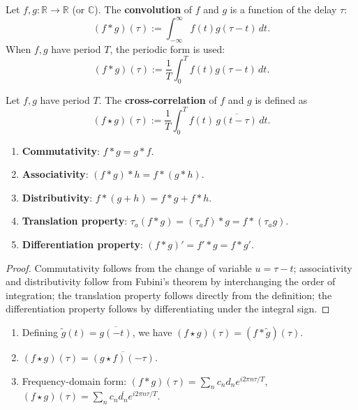 \begin{definition}\label{def:convolution}
Let $f, g: \mathbb{R} \to \mathbb{R}$ (or $\mathbb{C}$). The \textbf{convolution} of $f$ and $g$ is a function of the delay $\tau$:
\[
(f * g)(\tau) := \int_{-\infty}^{\infty} f(t) g(\tau - t)\,dt.
\]
When $f, g$ have period $T$, the periodic form is used:
\[
(f * g)(\tau) := \frac{1}{T}\int_0^T f(t) g(\tau - t)\,dt.
\]
\end{definition}

\begin{definition}\label{def:cross_correlation}
Let $f, g$ have period $T$. The \textbf{cross-correlation} of $f$ and $g$ is defined as
\[
(f \star g)(\tau) := \frac{1}{T}\int_0^T f(t)\, \overline{g(t - \tau)}\,dt.
\]
\end{definition}

\begin{proposition}\label{prop:convolution_properties}
\leavevmode\par
\begin{enumerate}[label=(\roman*)]
    \item \textbf{Commutativity}: $f * g = g * f$.
    \item \textbf{Associativity}: $(f * g) * h = f * (g * h)$.
    \item \textbf{Distributivity}: $f * (g + h) = f * g + f * h$.
    \item \textbf{Translation property}: $\tau_a(f * g) = (\tau_a f) * g = f * (\tau_a g)$.
    \item \textbf{Differentiation property}: $(f * g)' = f' * g = f * g'$.
\end{enumerate}
\end{proposition}

\begin{proof}
Commutativity follows from the change of variable $u = \tau - t$; associativity and distributivity follow from Fubini's theorem by interchanging the order of integration; the translation property follows directly from the definition; the differentiation property follows by differentiating under the integral sign.
\end{proof}

\begin{proposition}\label{prop:cross_corr_properties}
\leavevmode\par
\begin{enumerate}[label=(\roman*)]
    \item Defining $\widetilde{g}(t) = \overline{g(-t)}$, we have $(f \star g)(\tau) = (f * \widetilde{g})(\tau)$.
    \item $(f \star g)(\tau) = \overline{(g \star f)(-\tau)}$.
    \item Frequency-domain form: $(f * g)(\tau) = \sum_{n} c_n d_n e^{i 2\pi n \tau / T}$, $(f \star g)(\tau) = \sum_{n} c_n \overline{d_n} e^{i 2\pi n \tau / T}$.
\end{enumerate}
\end{proposition}

